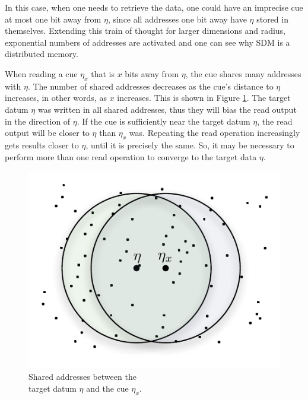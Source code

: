 In this case, when one needs to retrieve the data, one could have an imprecise cue at most one bit away from $\eta$, since all addresses one bit away have $\eta$ stored in themselves.  Extending this train of thought for larger dimensions and radius, exponential numbers of addresses are activated and one can see why SDM is a distributed memory.

When reading a cue $\eta_{x}$ that is $x$ bits away from $\eta$, the cue shares many addresses with $\eta$. The number of shared addresses decreases as the cue's distance to $\eta$ increases, in other words, as $x$ increases. This is shown in Figure \ref{fig-shared-addresses}.  The target datum $\eta$ was written in all shared addresses, thus they will bias the read output in the direction of $\eta$. If the cue is sufficiently near the target datum $\eta$, the read output will be closer to $\eta$ than $\eta_{x}$ was. Repeating the read operation increasingly gets results closer to $\eta$, until it is precisely the same. So, it may be necessary to perform more than one read operation to converge to the target data $\eta$.

\begin{figure}[!htb]
\centering\includegraphics[scale=0.75]{./images02/p1_inter_p2.pdf}

\caption{Shared addresses between the \protect \\
target datum $\eta$ and the cue $\eta_{x}$. \label{fig-shared-addresses}}
\end{figure}



